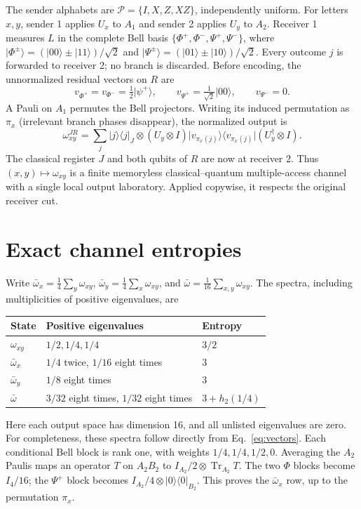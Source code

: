 \documentclass[11pt]{article}
\newcommand{\ket}[1]{\lvert #1\rangle}
\newcommand{\bra}[1]{\langle #1\rvert}
\newcommand{\proj}[1]{\ket{#1}\!\bra{#1}}
\newcommand{\tr}{\operatorname{Tr}}
\newcommand{\hbin}{h_2}
\begin{document}
The sender alphabets are $\mathcal P=\{I,X,Z,XZ\}$, independently uniform.
For letters $x,y$, sender 1 applies $U_x$ to $A_1$ and sender 2 applies $U_y$
to $A_2$. Receiver 1 measures $L$ in the complete Bell basis
$\{\Phi^+,\Phi^-,\Psi^+,\Psi^-\}$, where
$\ket{\Phi^\pm}=(\ket{00}\pm\ket{11})/\sqrt2$ and
$\ket{\Psi^\pm}=(\ket{01}\pm\ket{10})/\sqrt2$.
Every outcome $j$ is forwarded to receiver 2; no branch is discarded.
Before encoding, the unnormalized residual vectors on $R$ are
\begin{equation}\label{eq:vectors}
 v_{\Phi^+}=v_{\Phi^-}=\tfrac12\ket{\psi^+},\qquad
 v_{\Psi^+}=\tfrac1{\sqrt2}\ket{00},\qquad v_{\Psi^-}=0.
\end{equation}
A Pauli on $A_1$ permutes the Bell projectors. Writing its induced permutation
as $\pi_x$ (irrelevant branch phases disappear), the normalized output is
\begin{equation}\label{eq:channel}
 \omega_{xy}^{JR}=\sum_j\proj{j}_J\otimes
 (U_y\otimes I)\ket{v_{\pi_x(j)}}\bra{v_{\pi_x(j)}}(U_y^\dagger\otimes I).
\end{equation}
The classical register $J$ and both qubits of $R$ are now at receiver 2.
Thus $(x,y)\mapsto\omega_{xy}$ is a finite memoryless classical--quantum
multiple-access channel with a single local output laboratory. Applied
copywise, it respects the original receiver cut.

\section{Exact channel entropies}
Write $\bar\omega_x=\tfrac14\sum_y\omega_{xy}$,
$\bar\omega_y=\tfrac14\sum_x\omega_{xy}$, and
$\bar\omega=\tfrac1{16}\sum_{x,y}\omega_{xy}$.
The spectra, including multiplicities of positive eigenvalues, are
\begin{center}
\begin{tabular}{lll}
\toprule
State & Positive eigenvalues & Entropy\\
\midrule
$\omega_{xy}$ & $1/2,1/4,1/4$ & $3/2$\\
$\bar\omega_x$ & $1/4$ twice, $1/16$ eight times & $3$\\
$\bar\omega_y$ & $1/8$ eight times & $3$\\
$\bar\omega$ & $3/32$ eight times, $1/32$ eight times & $3+\hbin(1/4)$\\
\bottomrule
\end{tabular}
\end{center}
Here each output space has dimension 16, and all unlisted eigenvalues are zero.
For completeness, these spectra follow directly from Eq.~\eqref{eq:vectors}.
Each conditional Bell block is rank one, with weights $1/4,1/4,1/2,0$.
Averaging the $A_2$ Paulis maps an operator $T$ on $A_2B_2$ to
$I_{A_2}/2\otimes\tr_{A_2}T$. The two $\Phi$ blocks become $I_4/16$;
the $\Psi^+$ block becomes $I_{A_2}/4\otimes\proj{0}_{B_2}$.
This proves the $\bar\omega_x$ row, up to the permutation $\pi_x$.
\end{document}
